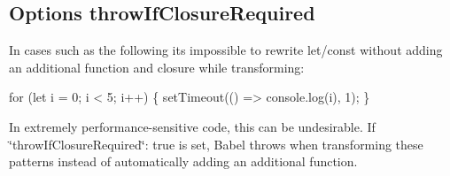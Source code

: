 \subsection*{Options {\ttfamily throw\+If\+Closure\+Required}}

In cases such as the following it\textquotesingle{}s impossible to rewrite let/const without adding an additional function and closure while transforming\+:


\begin{DoxyCode}
for (let i = 0; i < 5; i++) \{
  setTimeout(() => console.log(i), 1);
\}
\end{DoxyCode}


In extremely performance-\/sensitive code, this can be undesirable. If {\ttfamily \char`\"{}throw\+If\+Closure\+Required\char`\"{}\+: true} is set, Babel throws when transforming these patterns instead of automatically adding an additional function. 